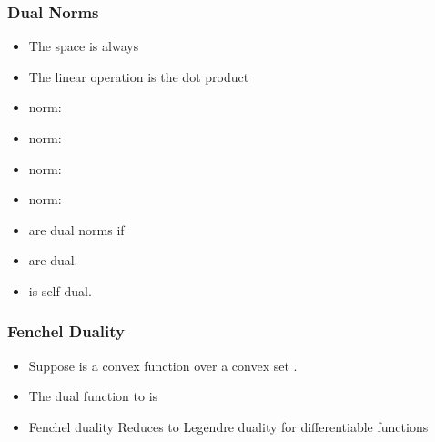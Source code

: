 \documentclass[handout]{beamer}
\begin{document}
\begin{small}
\begin{frame}
\frametitle{Dual Norms}
\begin{itemize}
  \item The space is always 
  \item The linear operation is the dot product \R{$\vu \cdot \vv$}
\item {} norm: 
\item {} norm: 
\item {} norm: 
\item {} norm: 
\item {} are dual norms if 
\item {} are dual.
\item {} is self-dual. 
\end{itemize}
\end{frame}

\begin{frame}
\frametitle{Fenchel Duality}
\begin{itemize}
\item Suppose  is a convex function over a convex set .
\item The dual function to  is
  \item Fenchel duality Reduces to Legendre duality for differentiable functions

\end{itemize}
\end{frame}


\end{small}
\end{document}
